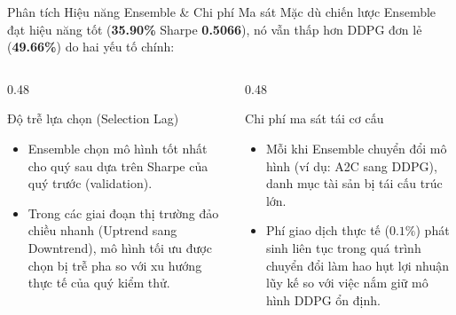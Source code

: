 \documentclass[10pt,aspectratio=169]{beamer}
\begin{document}
\begin{frame}{Phân tích Hiệu năng Ensemble \& Chi phí Ma sát}
  Mặc dù chiến lược Ensemble đạt hiệu năng tốt (\textbf{35.90\%} Sharpe \textbf{0.5066}), nó vẫn thấp hơn DDPG đơn lẻ (\textbf{49.66\%}) do hai yếu tố chính:
  \vspace{0.2cm}
  \begin{columns}[t]
    \begin{column}{0.48\textwidth}
      \begin{block}{Độ trễ lựa chọn (Selection Lag)}
        \begin{itemize}
          \item Ensemble chọn mô hình tốt nhất cho quý sau dựa trên Sharpe của quý trước (validation).
          \item Trong các giai đoạn thị trường đảo chiều nhanh (Uptrend sang Downtrend), mô hình tối ưu được chọn bị trễ pha so với xu hướng thực tế của quý kiểm thử.
        \end{itemize}
      \end{block}
    \end{column}
    
    \begin{column}{0.48\textwidth}
      \begin{alertblock}{Chi phí ma sát tái cơ cấu}
        \begin{itemize}
          \item Mỗi khi Ensemble chuyển đổi mô hình (ví dụ: A2C sang DDPG), danh mục tài sản bị tái cấu trúc lớn.
          \item Phí giao dịch thực tế ($0.1\%$) phát sinh liên tục trong quá trình chuyển đổi làm hao hụt lợi nhuận lũy kế so với việc nắm giữ mô hình DDPG ổn định.
        \end{itemize}
      \end{alertblock}
    \end{column}
  \end{columns}
\end{frame}
\end{document}
